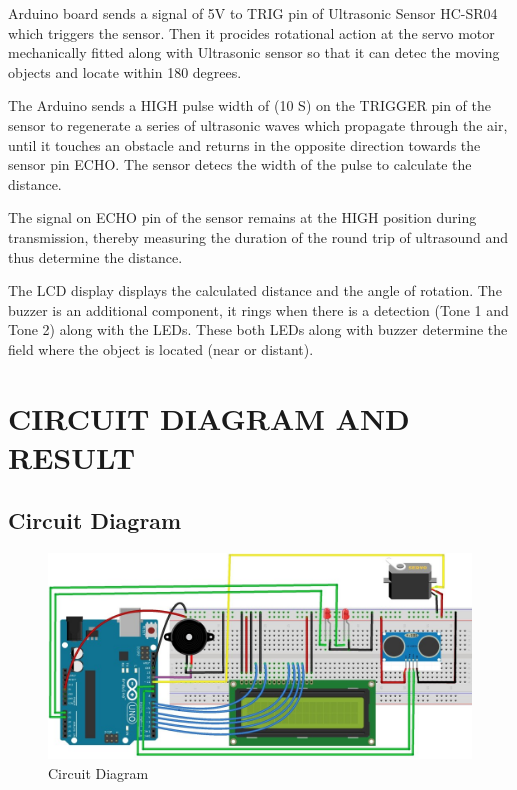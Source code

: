 \documentclass[a4paper,13pt]{report}
\begin{document}
                    \large{
                        Arduino board sends a signal of 5V to TRIG pin of Ultrasonic Sensor HC-SR04 
                    which triggers the sensor. Then it procides rotational action at the servo motor mechanically 
                    fitted along with Ultrasonic sensor so that it can detec the moving objects and locate within 
                    180 degrees. \\ 
                    \vspace{1mm}
                    \par The Arduino sends a HIGH pulse width of (10 S) on the TRIGGER pin of the sensor to 
                    regenerate  a series of ultrasonic waves which propagate through the air, until it touches 
                    an obstacle and returns in the opposite direction towards the sensor pin ECHO. The sensor 
                    detecs the width of the pulse to calculate the distance. \\
                    \vspace{1mm}
                    \par The signal on ECHO pin of the sensor remains at the HIGH position during transmission, 
                    thereby measuring the duration of the round trip of ultrasound and thus determine the distance. \\
                    \vspace{1mm}
                    \par The LCD display displays the calculated distance and the angle of rotation. The buzzer 
                    is an additional component, it rings when there is a detection (Tone 1 and Tone 2) along 
                    with the LEDs. These both LEDs along with buzzer determine the field where the object is 
                    located (near or distant). \\}
        \section{CIRCUIT DIAGRAM AND RESULT}
            \subsection{\large{Circuit Diagram}}
                \begin{figure}[H]
                    \centering
                    \includegraphics[width=\linewidth]{circuit.jpg}
                    \caption{\label{fig:pic}Circuit Diagram}
                \end{figure}
\end{document}
